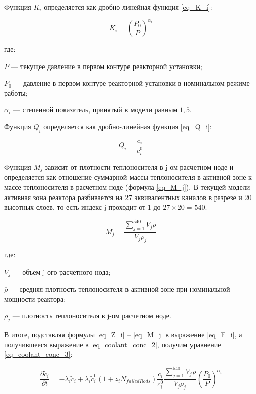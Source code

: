 Функция $K_{i}$ определяется как дробно-линейная функция \ref{eq_K_i}:

\begin{equation}
    \label{eq_K_i}
    K_{i} = (\frac{P_{0}}{P})^{\alpha_{i}}
\end{equation}

где:
\begin{description}
    \item $P$ --- текущее давление в первом контуре реакторной установки;
    \item $P_{0}$ --- давление в первом контуре реакторной установки в номинальном режиме работы;
    \item $\alpha_{i}$ --- степенной показатель, принятый в модели равным $1,5$.
\end{description}

Функция $Q_{i}$ определяется как дробно-линейная функция \ref{eq_Q_i}:

\begin{equation}
    \label{eq_Q_i}
    Q_{i} = \frac{c_{i}}{c_{i}^{0}}
\end{equation}

Функция $M_{j}$ зависит от плотности теплоносителя в j-ом расчетном ноде и определяется как отношение суммарной массы 
теплоносителя в активной зоне к массе теплоносителя в расчетном ноде (формула \ref{eq_M_j}). В текущей модели активная 
зона реактора разбивается на 27 эквивалентных каналов в разрезе и 20 высотных слоев, то есть индекс j проходит от 1 до 
$27 \times 20 = 540$.

\begin{equation}
    \label{eq_M_j}
    M_{j} = \frac{\sum_{j=1}^{540} V_{j}\overline{\rho}}{V_{j}\rho_{j}}
\end{equation}

где:
\begin{description}
    \item $V_{j}$ --- объем j-ого расчетного нода;
    \item $\overline{\rho}$ --- средняя плотность теплоносителя в активной зоне при номинальной мощности реактора;
    \item $\rho_{j}$ --- плотность теплоносителя в j-ом расчетном ноде.
\end{description}

В итоге, подставляя формулы \ref{eq_Z_i} -- \ref{eq_M_j} в выражение \ref{eq_F_i}, а получившееся выражение в 
\ref{eq_coolant_conc_2}, получим уравнение \ref{eq_coolant_conc_3}:

\begin{equation}
    \label{eq_coolant_conc_3}
    \frac{\partial \widetilde{c}_{i}}{\partial t} = -\lambda_{i}\widetilde{c}_{i} + \lambda_{i}\widetilde{c}_{i}^{0}
        (1 + z_{i}N_{failedRods})\frac{c_{i}}{c_{i}^{0}}\frac{\sum_{j=1}^{540} V_{j}\overline{\rho}}{V_{j}\rho_{j}}
        (\frac{P_{0}}{P})^{\alpha_{i}}
\end{equation}

